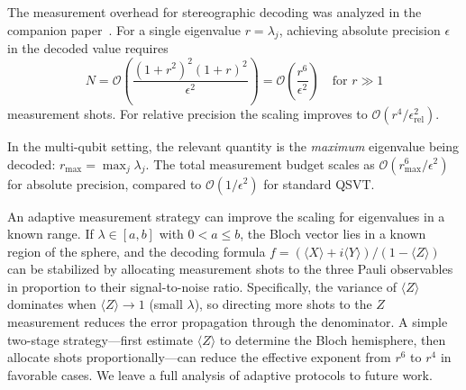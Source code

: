 The measurement overhead for stereographic decoding was analyzed
in the companion paper~\cite{KharaziLeytonOrtega2026a}.  For a
single eigenvalue $r = \lambda_j$, achieving absolute precision
$\epsilon$ in the decoded value requires
\begin{equation}
	N = \mathcal{O}\!\left(\frac{(1+r^2)^2(1+r)^2}{\epsilon^2}\right)
	= \mathcal{O}\!\left(\frac{r^6}{\epsilon^2}\right)
	\quad \text{for } r \gg 1
	\label{eq:shot-count}
\end{equation}
measurement shots.  For relative precision the scaling improves
to $\mathcal{O}(r^4/\epsilon_{\mathrm{rel}}^2)$.

In the multi-qubit setting, the relevant quantity is the
\emph{maximum} eigenvalue being decoded:
$r_{\max} = \max_j \lambda_j$.  The total measurement budget
scales as $\mathcal{O}(r_{\max}^6/\epsilon^2)$ for absolute
precision, compared to $\mathcal{O}(1/\epsilon^2)$ for standard
QSVT.

An adaptive measurement strategy can improve the scaling
for eigenvalues in a known range.  If $\lambda \in [a, b]$
with $0 < a \leq b$, the Bloch vector lies in a known
region of the sphere, and the decoding formula
$f = (\langle X \rangle + i\langle Y \rangle)
	/ (1 - \langle Z \rangle)$ can be stabilized by allocating
measurement shots to the three Pauli observables in
proportion to their signal-to-noise ratio.  Specifically,
the variance of $\langle Z \rangle$ dominates when $\langle
	Z \rangle \to 1$ (small $\lambda$), so directing more shots
to the $Z$ measurement reduces the error propagation
through the denominator.  A simple two-stage strategy---first
estimate $\langle Z \rangle$ to determine the Bloch
hemisphere, then allocate shots proportionally---can reduce
the effective exponent from $r^6$ to $r^4$ in favorable
cases.  We leave a full analysis of adaptive protocols to
future work.
